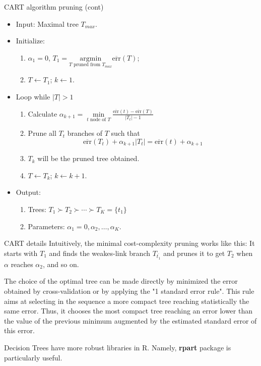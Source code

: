 \documentclass{beamer}
\begin{document}
\begin{frame}{CART algorithm pruning (cont)}
	\begin{itemize}
		\item Input: Maximal tree $T_{max}$.
		\item Initialize:
		\begin{enumerate}
			\item $\alpha_1=0$, $T_1 = \underset{ T \text{ pruned from }T_{max}  }{\textrm{argmin}}
			\overline{\text{err}} (T)$; 
			\item $T \leftarrow T_1$; $k\leftarrow1$. 
		\end{enumerate}
	\item Loop while $|T|>1$
	\begin{enumerate}
		\item Calculate $\alpha_{k+1}= \underset{ t \text{ node of }T  }{\min}
		\frac{\overline{\text{err}} (t)- \overline{\text{err}}(T)}{|T_t| -1}$
		\item Prune all $T_t$ branches of $T$ such that
		\begin{equation*}
			\overline{\text{err}}(T_t)+ \alpha_{k+1}|T_t|= \overline{\text{err}}(t)+ \alpha_{k+1}
		\end{equation*}
	\item $T_k$ will be the pruned tree obtained. 
	\item $T\leftarrow T_k$; $k\leftarrow k+1$.
	\end{enumerate}
	\item Output: 
	\begin{enumerate}
		\item Trees: $T_1 \succ T_2 \succ \cdots \succ T_K=\{t_1\}$
		\item Parameters: $\alpha_1=0, \alpha_2, \ldots, \alpha_K$.
	\end{enumerate}
	\end{itemize}
\end{frame}

\begin{frame}{CART details}
	Intuitively, the minimal cost-complexity pruning works like this: It starts with $T_1$ and finds the weakes-link branch $T_{\overline{t_1}}$ and prunes it to get $T_2$ when $\alpha$ reaches $\alpha_2$, and so on.
	
	The choice of the optimal tree can be made directly by minimized the error obtained by cross-validation or by applying the "1 standard error rule".  This rule aims at selecting in the sequence a more compact tree reaching statistically the same error. Thus, it chooses the most compact tree reaching an error lower than the value of the previous minimum augmented by the estimated standard error of this error. 
	
 	Decision Trees have  more robust libraries in R.  Namely, \textbf{rpart} package is particularly useful.
	
\end{frame}
\end{document}
